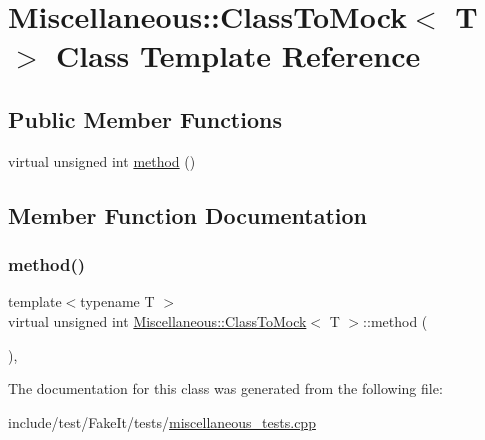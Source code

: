 \hypertarget{classMiscellaneous_1_1ClassToMock}{}\section{Miscellaneous\+::Class\+To\+Mock$<$ T $>$ Class Template Reference}
\label{classMiscellaneous_1_1ClassToMock}
\subsection*{Public Member Functions}
\begin{DoxyCompactItemize}
\item 
virtual unsigned int \mbox{\hyperlink{classMiscellaneous_1_1ClassToMock_aaa873f7b82c95df399f72709b95f3a9a}{method}} ()
\end{DoxyCompactItemize}


\subsection{Member Function Documentation}
\mbox{\label{classMiscellaneous_1_1ClassToMock_aaa873f7b82c95df399f72709b95f3a9a}} 
\subsubsection{\texorpdfstring{method()}{method()}}
{\footnotesize\ttfamily template$<$typename T $>$ \\
virtual unsigned int \mbox{\hyperlink{classMiscellaneous_1_1ClassToMock}{Miscellaneous\+::\+Class\+To\+Mock}}$<$ T $>$\+::method (\begin{DoxyParamCaption}{ }\end{DoxyParamCaption})\hspace{0.3cm}{\ttfamily [inline]}, {\ttfamily [virtual]}}



The documentation for this class was generated from the following file\+:\begin{DoxyCompactItemize}
\item 
include/test/\+Fake\+It/tests/\mbox{\hyperlink{miscellaneous__tests_8cpp}{miscellaneous\+\_\+tests.\+cpp}}\end{DoxyCompactItemize}
